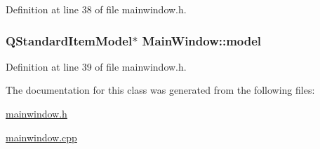 Definition at line 38 of file mainwindow.\+h.

\hypertarget{class_main_window_aa1a1f8ce9c37a7ac70d21402759638b3}{
\subsubsection[{model}]{\setlength{\rightskip}{0pt plus 5cm}Q\+Standard\+Item\+Model$\ast$ Main\+Window\+::model\hspace{0.3cm}{\ttfamily [private]}}}\label{class_main_window_aa1a1f8ce9c37a7ac70d21402759638b3}


Definition at line 39 of file mainwindow.\+h.



The documentation for this class was generated from the following files\+:\begin{DoxyCompactItemize}
\item 
\hyperlink{mainwindow_8h}{mainwindow.\+h}\item 
\hyperlink{mainwindow_8cpp}{mainwindow.\+cpp}\end{DoxyCompactItemize}
